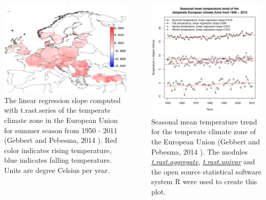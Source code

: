 \documentclass[25pt, margin=0mm, innermargin=15mm, blockverticalspace=15mm, colspace=15mm, subcolspace=8mm]{tikzposter}
\newcommand{\gmodule}[1]{\href{http://grass.osgeo.org/grass70/manuals/#1.html}{\emph{#1}}}
\begin{document}
\begin{columns}
{\begin{minipage}{0.5\linewidth}
\includegraphics[scale=0.5]{images/summer_mean_temp_slope.pdf}
The linear regression slope computed with t.rast.series of the temperate climate zone in the European Union
for summer season from 1950 - 2011 (Gebbert and Pebesma, 2014 \cite{Gebbert20141}). Red color
indicates rising temperature, blue indicates falling temperature. Units are degree Celsius per year.
\end{minipage}
~
\begin{minipage}{0.5\linewidth}
\includegraphics[scale=1.25]{images/Seasonal_temperature_trend_Europe_1950_2010.pdf}
Seasonal mean temperature trend for the temperate climate zone of the European Union
(Gebbert and Pebesma, 2014 \cite{Gebbert20141}). The modules \gmodule{t.rast.aggregate},
\gmodule{t.rast.univar} and the open source statistical software system R
were used to create this plot.
\end{minipage}

}
\end{columns}
\end{document}
